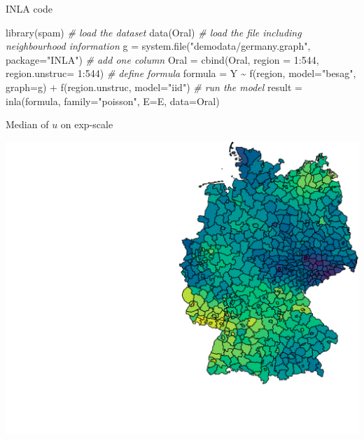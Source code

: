 \documentclass[
  ignorenonframetext,
]{beamer}
\newenvironment{Shaded}{\begin{snugshade}}{\end{snugshade}}
\newcommand{\AttributeTok}[1]{\textcolor[rgb]{0.77,0.63,0.00}{#1}}
\newcommand{\CommentTok}[1]{\textcolor[rgb]{0.56,0.35,0.01}{\textit{#1}}}
\newcommand{\DecValTok}[1]{\textcolor[rgb]{0.00,0.00,0.81}{#1}}
\newcommand{\FunctionTok}[1]{\textcolor[rgb]{0.00,0.00,0.00}{#1}}
\newcommand{\NormalTok}[1]{#1}
\newcommand{\OtherTok}[1]{\textcolor[rgb]{0.56,0.35,0.01}{#1}}
\newcommand{\SpecialCharTok}[1]{\textcolor[rgb]{0.00,0.00,0.00}{#1}}
\newcommand{\StringTok}[1]{\textcolor[rgb]{0.31,0.60,0.02}{#1}}
\begin{document}
\begin{frame}[fragile]{INLA code}
\protect\hypertarget{inla-code}{}
\begin{Shaded}
\begin{Highlighting}[]
\FunctionTok{library}\NormalTok{(spam)}
\CommentTok{\# load the dataset}
\FunctionTok{data}\NormalTok{(Oral)}
\CommentTok{\# load the file including neighbourhood information}
\NormalTok{g }\OtherTok{=} \FunctionTok{system.file}\NormalTok{(}\StringTok{"demodata/germany.graph"}\NormalTok{, }\AttributeTok{package=}\StringTok{"INLA"}\NormalTok{)}
\CommentTok{\# add one column }
\NormalTok{Oral }\OtherTok{=} \FunctionTok{cbind}\NormalTok{(Oral, }\AttributeTok{region =} \DecValTok{1}\SpecialCharTok{:}\DecValTok{544}\NormalTok{, }\AttributeTok{region.unstruc=} \DecValTok{1}\SpecialCharTok{:}\DecValTok{544}\NormalTok{)}
\CommentTok{\# define formula}
\NormalTok{formula }\OtherTok{=}\NormalTok{ Y }\SpecialCharTok{\textasciitilde{}} \FunctionTok{f}\NormalTok{(region, }\AttributeTok{model=}\StringTok{"besag"}\NormalTok{, }\AttributeTok{graph=}\NormalTok{g) }\SpecialCharTok{+}
                           \FunctionTok{f}\NormalTok{(region.unstruc, }\AttributeTok{model=}\StringTok{"iid"}\NormalTok{)}
\CommentTok{\# run the model}
\NormalTok{result }\OtherTok{=} \FunctionTok{inla}\NormalTok{(formula, }\AttributeTok{family=}\StringTok{"poisson"}\NormalTok{, }\AttributeTok{E=}\NormalTok{E, }\AttributeTok{data=}\NormalTok{Oral)}
\end{Highlighting}
\end{Shaded}
\end{frame}

\begin{frame}{Median of \(u\) on exp-scale}
\protect\hypertarget{median-of-u-on-exp-scale}{}
\small

\begin{center}\includegraphics[width=0.6\linewidth]{Part3_RINLA_files/figure-beamer/unnamed-chunk-46-1} \end{center}
\end{frame}
\end{document}
